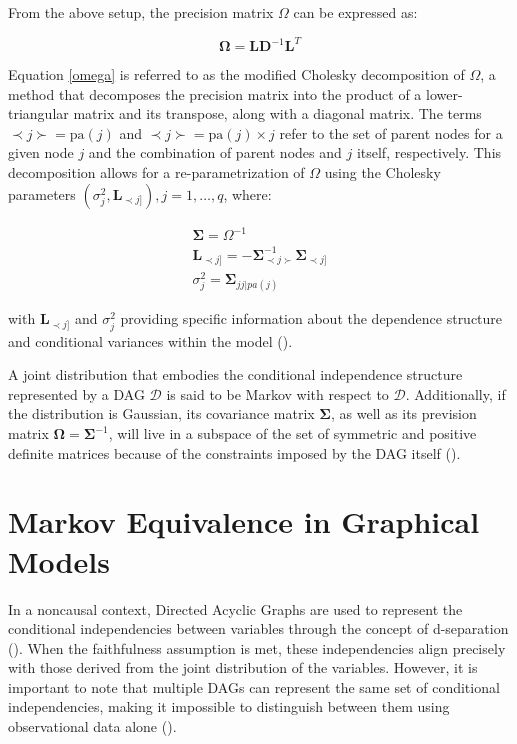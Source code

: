 \documentclass{report}
\begin{document}
From the above setup, the precision matrix $\Omega$ can be expressed as:

\begin{equation} \label{omega}
	\mathbf{\Omega} = \mathbf{L}\mathbf{D}^{-1}\mathbf{L}^T
\end{equation}

Equation \ref{omega} is referred to as the modified Cholesky decomposition of $\Omega$, a method that decomposes the precision matrix into the product of a lower-triangular matrix and its transpose, along with a diagonal matrix. The terms $\prec j \succ = \text{pa}(j)$ and $\prec j \succ = \text{pa}(j) \times j$ refer to the set of parent nodes for a given node $j$ and the combination of parent nodes and $j$ itself, respectively. This decomposition allows for a re-parametrization of $\Omega$ using the Cholesky parameters ${ (\sigma_j^2, \mathbf{L}_{\prec j]}), j = 1, \ldots, q }$, where:

\begin{equation} \label{L-Sigma}
	\begin{split}
		\mathbf{\Sigma} = \Omega^{-1}  \\
		\mathbf{L}_{\prec j]} = -\mathbf{\Sigma}^{-1}_{\prec j \succ} \mathbf{\Sigma}_{\prec j]} \\
		\sigma^2_j = \mathbf{\Sigma}_{jj | pa(j)} 
	\end{split}
\end{equation}

with $\mathbf{L}_{\prec j]}$ and $\sigma_j^2$ providing specific information about the dependence structure and conditional variances within the model (\citet{castelletti2021bayesian}). 

A joint distribution that embodies the conditional independence structure represented by a DAG $\mathcal{D}$ is said to be Markov with respect to $\mathcal{D}$. Additionally, if the distribution is Gaussian, its covariance matrix $\mathbf{\Sigma}$, as well as its prevision matrix $\mathbf{\Omega}=\mathbf{\Sigma}^{-1}$, will live in a subspace of the set of symmetric and positive definite matrices because of the constraints imposed by the DAG itself (\citet{peluso2020compatible}).

\section{Markov Equivalence in Graphical Models}

In a noncausal context, Directed Acyclic Graphs are used to represent the conditional independencies between variables through the concept of d-separation (\citet{neuberg2003causality}). When the faithfulness assumption is met, these independencies align precisely with those derived from the joint distribution of the variables. However, it is important to note that multiple DAGs can represent the same set of conditional independencies, making it impossible to distinguish between them using observational data alone (\citet{castelletti2018learning}). 
\end{document}
